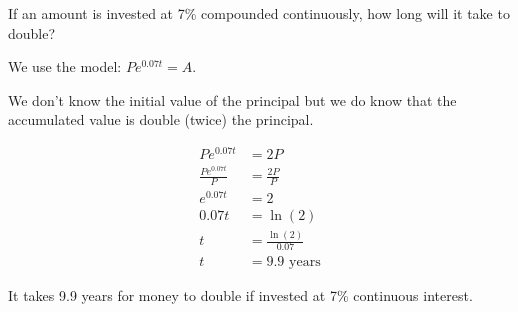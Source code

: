 \begin{example}
    If an amount is invested at 7\% compounded continuously, how long will it take to double?
\end{example}
\begin{solution}
    We use the model: \( Pe^{0.07t} = A \).

    We don’t know the initial value of the principal but we do know that the accumulated value is double (twice) the principal.

    \begin{align*}
        Pe^{0.07t}           & = 2P                  \\
        \frac{Pe^{0.07t}}{P} & = \frac{2P}{P}        \\
        e^{0.07t}            & = 2                   \\
        0.07t                & = \ln(2)              \\
        t                    & = \frac{\ln(2)}{0.07} \\
        t                    & = 9.9 \text{ years}
    \end{align*}

    It takes 9.9 years for money to double if invested at 7\% continuous interest.
\end{solution}

